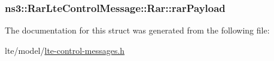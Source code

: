 \subsubsection[{\texorpdfstring{rar\+Payload}{rarPayload}}]{ ns3\+::\+Rar\+Lte\+Control\+Message\+::\+Rar\+::rar\+Payload}\hypertarget{structns3_1_1RarLteControlMessage_1_1Rar_a9a2a25a5c301ab73d2ba36cf7b611ce0}{}\label{structns3_1_1RarLteControlMessage_1_1Rar_a9a2a25a5c301ab73d2ba36cf7b611ce0}


The documentation for this struct was generated from the following file\+:\begin{DoxyCompactItemize}
\item 
lte/model/\hyperlink{lte-control-messages_8h}{lte-\/control-\/messages.\+h}\end{DoxyCompactItemize}
